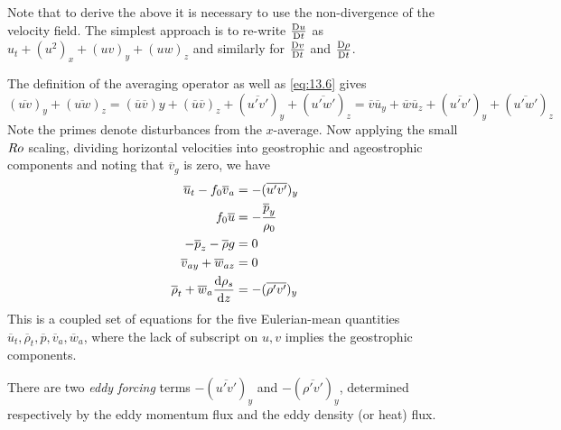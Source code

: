 \documentclass{jknotes}
\begin{document}
Note that to derive the above it is necessary to use the non-divergence of the
velocity field. The simplest approach is to re-write $\frac{\mathrm{D} u}{\mathrm{D}
	t}$ as $u_t + (u^2)_x + (uv)_y + (uw)_z$ and similarly for $\frac{\mathrm{D}
v}{\mathrm{D} t}$ and $\frac{\mathrm{D} \rho}{\mathrm{D} t}$. 

The definition of the averaging operator as well as \eqref{eq:13.6} gives
\begin{equation}
	(\overline{uv})_y + (\overline{uw})_z = (\overline{u}\overline{v})y +
	(\overline{u}\overline{v})_z + (\overline{u'v'})_y + (\overline{u'w'})_z =
	\overline{v}\overline{u}_y + \overline{w}\overline{u}_z +
	(\overline{u'v'})_y + (\overline{u'w'})_z
\end{equation}
Note the primes denote disturbances from the $x$-average. Now applying the
small $Ro$ scaling, dividing horizontal velocities into geostrophic and
ageostrophic components and noting that $\overline{v}_g$ is zero, we have
\begin{align}
	\overline{u}_t - f_0 \overline{v}_a &= -(\overline{u'v'})_y
	\label{eq:13.8}\\
	f_0 \overline{u} &= -\frac{\overline{p}_y}{\rho_0} \label{eq:13.9}\\
	-\overline{p}_z - \overline{\rho}g &= 0 \label{eq:13.10}\\
	\overline{v}_{ay} + \overline{w}_{az} &= 0 \label{eq:13.11}\\
	\overline{\rho}_t + \overline{w}_a \frac{\diffd \rho_s}{\diffd z} &=
	-(\overline{\rho' v'})_y\label{eq:13.12}
\end{align}
This is a coupled set of equations for the five Eulerian-mean quantities
$\overline{u}_t, \overline{\rho}_t, \overline{p}, \overline{v}_a,
\overline{w}_a$, where the lack of subscript on $u, v$ implies the geostrophic
components.

There are two \emph{eddy forcing} terms $-(\overline{u'v'})_y$ and
$-(\overline{\rho'v'})_y$, determined respectively by the eddy momentum flux
and the eddy density (or heat) flux. 
\end{document}
